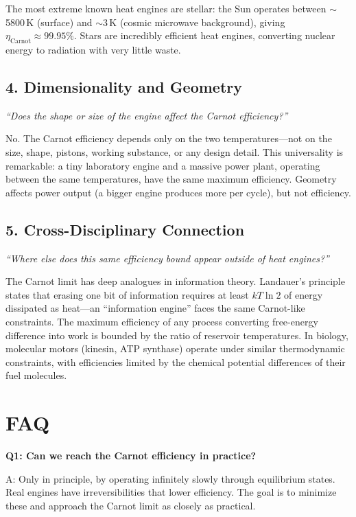 The most extreme known heat engines are stellar: the Sun operates between $\sim$5800\,K (surface) and $\sim$3\,K (cosmic microwave background), giving $\eta_{\text{Carnot}} \approx 99.95\%$. Stars are incredibly efficient heat engines, converting nuclear energy to radiation with very little waste.

\subsection*{4. Dimensionality and Geometry}
\textit{``Does the shape or size of the engine affect the Carnot efficiency?''}

No. The Carnot efficiency depends only on the two temperatures---not on the size, shape, pistons, working substance, or any design detail. This universality is remarkable: a tiny laboratory engine and a massive power plant, operating between the same temperatures, have the same maximum efficiency. Geometry affects power output (a bigger engine produces more per cycle), but not efficiency.

\subsection*{5. Cross-Disciplinary Connection}
\textit{``Where else does this same efficiency bound appear outside of heat engines?''}

The Carnot limit has deep analogues in information theory. Landauer's principle states that erasing one bit of information requires at least $kT \ln 2$ of energy dissipated as heat---an ``information engine'' faces the same Carnot-like constraints. The maximum efficiency of any process converting free-energy difference into work is bounded by the ratio of reservoir temperatures. In biology, molecular motors (kinesin, ATP synthase) operate under similar thermodynamic constraints, with efficiencies limited by the chemical potential differences of their fuel molecules.


\section*{FAQ}

\textbf{Q1: Can we reach the Carnot efficiency in practice?}

A: Only in principle, by operating infinitely slowly through equilibrium states. Real engines have irreversibilities that lower efficiency. The goal is to minimize these and approach the Carnot limit as closely as practical.

